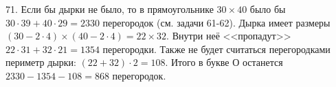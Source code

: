 71. Если бы дырки не было, то в прямоугольнике $30\times40$ было бы $30\cdot39+40\cdot29=2330$ перегородок (см. задачи 61-62). Дырка имеет размеры $(30-2\cdot4)\times(40-2\cdot4)=22\times32.$ Внутри неё <<пропадут>> $22\cdot31+32\cdot21=1354$ перегородки. Также не будет считаться перегородками периметр дырки: $(22+32)\cdot2=108.$ Итого в букве О останется $2330-1354-108=868$ перегородок.\\
